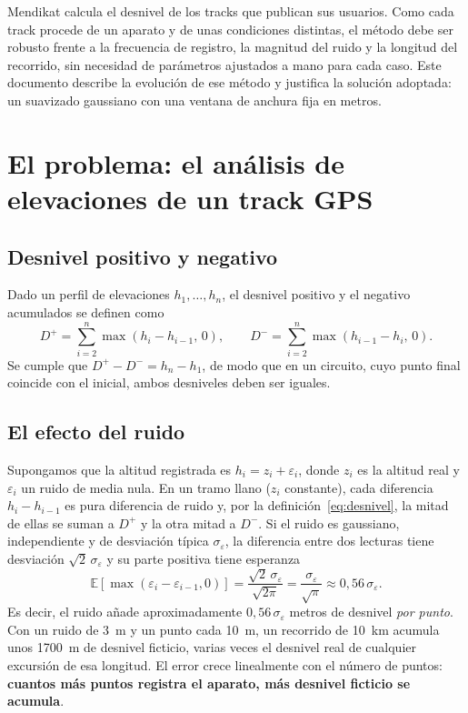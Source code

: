 \documentclass[11pt,a4paper]{article}
\newcommand{\Dpos}{D^{+}}
\newcommand{\Dneg}{D^{-}}
\begin{document}
Mendikat calcula el desnivel de los tracks que publican sus usuarios. Como cada
track procede de un aparato y de unas condiciones distintas, el método debe ser
robusto frente a la frecuencia de registro, la magnitud del ruido y la
longitud del recorrido, sin necesidad de parámetros ajustados a mano para cada
caso. Este documento describe la evolución de ese método y justifica la
solución adoptada: un suavizado gaussiano con una ventana de anchura fija en
metros.

\section{El problema: el análisis de elevaciones de un track GPS}
\label{sec:problema}

\subsection{Desnivel positivo y negativo}

Dado un perfil de elevaciones $h_1, \dots, h_n$, el desnivel positivo y el
negativo acumulados se definen como
\begin{equation}
    \Dpos = \sum_{i=2}^{n} \max\left(h_i - h_{i-1},\, 0\right),
    \qquad
    \Dneg = \sum_{i=2}^{n} \max\left(h_{i-1} - h_i,\, 0\right).
    \label{eq:desnivel}
\end{equation}
Se cumple que $\Dpos - \Dneg = h_n - h_1$, de modo que en un circuito, cuyo
punto final coincide con el inicial, ambos desniveles deben ser iguales.

\subsection{El efecto del ruido}

Supongamos que la altitud registrada es $h_i = z_i + \varepsilon_i$, donde
$z_i$ es la altitud real y $\varepsilon_i$ un ruido de media nula. En un tramo
llano ($z_i$ constante), cada diferencia $h_i - h_{i-1}$ es pura diferencia de
ruido y, por la definición~\eqref{eq:desnivel}, la mitad de ellas se suman a
$\Dpos$ y la otra mitad a $\Dneg$. Si el ruido es gaussiano, independiente
y de desviación típica $\sigma_\varepsilon$, la diferencia entre dos lecturas
tiene desviación $\sqrt{2}\,\sigma_\varepsilon$ y su parte positiva tiene
esperanza
\begin{equation}
    \mathbb{E}\left[\max(\varepsilon_i - \varepsilon_{i-1}, 0)\right]
    = \frac{\sqrt{2}\,\sigma_\varepsilon}{\sqrt{2\pi}}
    = \frac{\sigma_\varepsilon}{\sqrt{\pi}}
    \approx 0{,}56\,\sigma_\varepsilon .
\end{equation}
Es decir, el ruido añade aproximadamente $0{,}56\,\sigma_\varepsilon$ metros de
desnivel \emph{por punto}. Con un ruido de 3~m y un punto cada 10~m, un
recorrido de 10~km acumula unos 1700~m de desnivel ficticio, varias veces el
desnivel real de cualquier excursión de esa longitud. El error crece
linealmente con el número de puntos: \textbf{cuantos más puntos registra el
aparato, más desnivel ficticio se acumula}.
\end{document}
